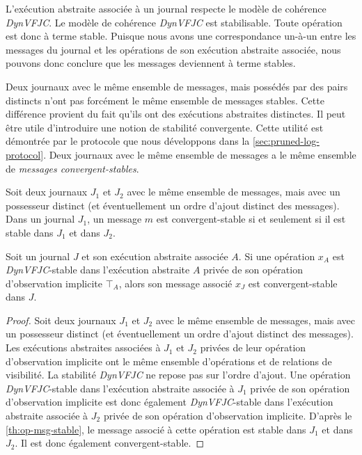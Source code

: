 L'exécution abstraite associée à un journal respecte le modèle de cohérence \emph{DynVFJC}.
Le modèle de cohérence \emph{DynVFJC} est stabilisable.
Toute opération est donc à terme stable.
Puisque nous avons une correspondance un-à-un entre les messages du journal et les opérations de son exécution abstraite associée, nous pouvons donc conclure que les messages deviennent à terme stables.


Deux journaux avec le même ensemble de messages, mais possédés par des pairs distincts n'ont pas forcément le même ensemble de messages stables.
Cette différence provient du fait qu'ils ont des exécutions abstraites distinctes.
Il peut être utile d'introduire une notion de stabilité convergente.
Cette utilité est démontrée par le protocole que nous développons dans la \autoref{sec:pruned-log-protocol}.
Deux journaux avec le même ensemble de messages a le même ensemble de \emph{messages convergent-stables}.

\begin{definition}\label{def:msg-conv-stable}
Soit deux journaux $J_1$ et $J_2$ avec le même ensemble de messages, mais avec un possesseur distinct (et éventuellement un ordre d'ajout distinct des messages).
Dans un journal $J_1$, un message $m$ est convergent-stable si et seulement si il est stable dans $J_1$ et dans $J_2$.
\end{definition}

\begin{theorem}
Soit un journal $J$ et son exécution abstraite associée $A$.
Si une opération $x_A$ est \emph{DynVFJC}-stable dans l'exécution abstraite $A$ privée de son opération d'observation implicite $\top_A$, alors son message associé $x_J$ est convergent-stable dans $J$.
\end{theorem}

\begin{proof}
Soit deux journaux $J_1$ et $J_2$ avec le même ensemble de messages, mais avec un possesseur distinct (et éventuellement un ordre d'ajout distinct des messages).
Les exécutions abstraites associées à $J_1$ et $J_2$ privées de leur opération d'observation implicite ont le même ensemble d'opérations et de relations de visibilité.
La stabilité \emph{DynVFJC} ne repose pas sur l'ordre d'ajout.
Une opération \emph{DynVFJC}-stable dans l'exécution abstraite associée à $J_1$ privée de son opération d'observation implicite est donc également \emph{DynVFJC}-stable dans l'exécution abstraite associée à $J_2$ privée de son opération d'observation implicite.
D'après le \autoref{th:op-msg-stable}, le message associé à cette opération est stable dans $J_1$ et dans $J_2$.
Il est donc également convergent-stable.
\end{proof}

